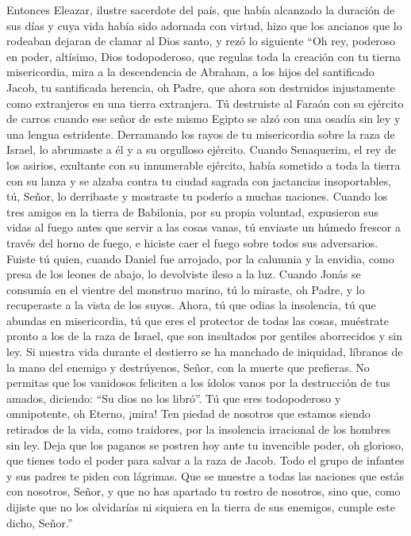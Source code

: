  Entonces Eleazar, ilustre sacerdote del país, que había
alcanzado la duración de sus días y cuya vida había sido adornada con
virtud, hizo que los ancianos que lo rodeaban dejaran de clamar al Dios
santo, y rezó lo siguiente  ``Oh rey, poderoso en poder,
altísimo, Dios todopoderoso, que regulas toda la creación con tu tierna
misericordia,  mira a la descendencia de Abraham, a los
hijos del santificado Jacob, tu santificada herencia, oh Padre, que
ahora son destruidos injustamente como extranjeros en una tierra
extranjera.  Tú destruiste al Faraón con su ejército de
carros cuando ese señor de este mismo Egipto se alzó con una osadía sin
ley y una lengua estridente. Derramando los rayos de tu misericordia
sobre la raza de Israel, lo abrumaste a él y a su orgulloso ejército.
 Cuando Senaquerim, el rey de los asirios, exultante con
su innumerable ejército, había sometido a toda la tierra con su lanza y
se alzaba contra tu ciudad sagrada con jactancias insoportables, tú,
Señor, lo derribaste y mostraste tu poderío a muchas naciones.
 Cuando los tres amigos en la tierra de Babilonia, por su
propia voluntad, expusieron sus vidas al fuego antes que servir a las
cosas vanas, tú enviaste un húmedo frescor a través del horno de fuego,
e hiciste caer el fuego sobre todos sus adversarios. 
Fuiste tú quien, cuando Daniel fue arrojado, por la calumnia y la
envidia, como presa de los leones de abajo, lo devolviste ileso a la
luz.  Cuando Jonás se consumía en el vientre del monstruo
marino, tú lo miraste, oh Padre, y lo recuperaste a la vista de los
suyos.  Ahora, tú que odias la insolencia, tú que abundas
en misericordia, tú que eres el protector de todas las cosas, muéstrate
pronto a los de la raza de Israel, que son insultados por gentiles
aborrecidos y sin ley.  Si nuestra vida durante el
destierro se ha manchado de iniquidad, líbranos de la mano del enemigo y
destrúyenos, Señor, con la muerte que prefieras.  No
permitas que los vanidosos feliciten a los ídolos vanos por la
destrucción de tus amados, diciendo: ``Su dios no los libró''.
 Tú que eres todopoderoso y omnipotente, oh Eterno,
¡mira! Ten piedad de nosotros que estamos siendo retirados de la vida,
como traidores, por la insolencia irracional de los hombres sin ley.
 Deja que los paganos se postren hoy ante tu invencible
poder, oh glorioso, que tienes todo el poder para salvar a la raza de
Jacob.  Todo el grupo de infantes y sus padres te piden
con lágrimas.  Que se muestre a todas las naciones que
estás con nosotros, Señor, y que no has apartado tu rostro de nosotros,
sino que, como dijiste que no los olvidarías ni siquiera en la tierra de
sus enemigos, cumple este dicho, Señor.''

